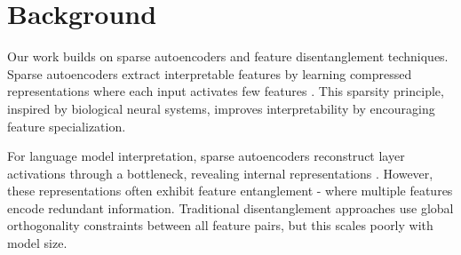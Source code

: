 \documentclass{article} %
\begin{document}






\section{Background}
\label{sec:background}

Our work builds on sparse autoencoders and feature disentanglement techniques. Sparse autoencoders extract interpretable features by learning compressed representations where each input activates few features \cite{Olshausen1996EmergenceOS}. This sparsity principle, inspired by biological neural systems, improves interpretability by encouraging feature specialization.

For language model interpretation, sparse autoencoders reconstruct layer activations through a bottleneck, revealing internal representations \cite{Cunningham2023SparseAF}. However, these representations often exhibit feature entanglement - where multiple features encode redundant information. Traditional disentanglement approaches use global orthogonality constraints between all feature pairs, but this scales poorly with model size.
\end{document}
